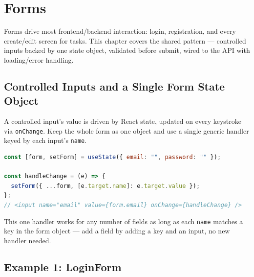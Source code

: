 \chapter{Forms}

Forms drive most frontend/backend interaction: login, registration, and
every create/edit screen for tasks. This chapter covers the shared
pattern --- controlled inputs backed by one state object, validated
before submit, wired to the API with loading/error handling.

\section{Controlled Inputs and a Single Form State Object}

A controlled input's value is driven by React state, updated on every
keystroke via \texttt{onChange}. Keep the whole form as one object and use
a single generic handler keyed by each input's \texttt{name}.

\begin{lstlisting}[language=JavaScript]
const [form, setForm] = useState({ email: "", password: "" });

const handleChange = (e) => {
  setForm({ ...form, [e.target.name]: e.target.value });
};
// <input name="email" value={form.email} onChange={handleChange} />
\end{lstlisting}

\begin{notebox}[NOTE]
This one handler works for any number of fields as long as each
\texttt{name} matches a key in the form object --- add a field by adding a
key and an input, no new handler needed.
\end{notebox}

\section{Example 1: LoginForm}

